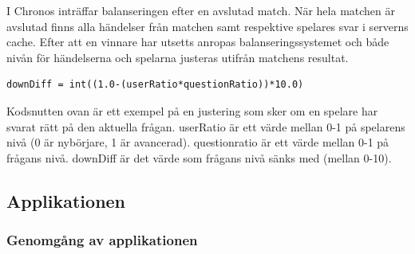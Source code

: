 \documentclass[a4paper, 11pt]{article}
\begin{document}
I Chronos inträffar balanseringen efter en avslutad match. När hela matchen är avslutad finns alla händelser från matchen samt respektive spelares svar i serverns cache. Efter att en vinnare har utsetts anropas balanseringssystemet och både nivån för händelserna och spelarna justeras utifrån matchens resultat.

\begin{verbatim}
downDiff = int((1.0-(userRatio*questionRatio))*10.0)
\end{verbatim}

Kodsnutten ovan är ett exempel på en justering som sker om en spelare har svarat rätt på den aktuella frågan. userRatio är ett värde mellan 0-1 på spelarens nivå (0 är nybörjare, 1 är avancerad). questionratio är ett värde mellan 0-1 på frågans nivå. downDiff är det värde som frågans nivå sänks med (mellan 0-10). 

\pagebreak
\subsection{Applikationen}

\subsubsection{Genomgång av applikationen}
 
\end{document}
